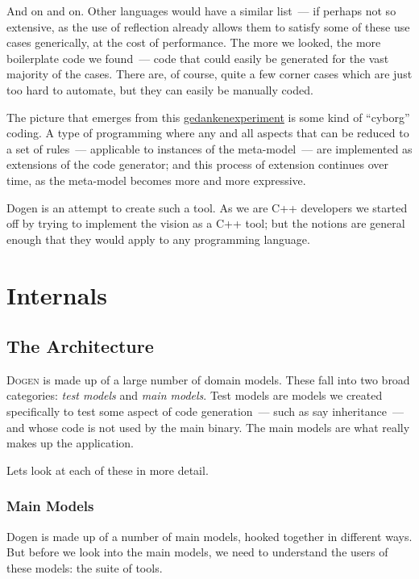 \documentclass{book}
\begin{document}
And on and on. Other languages would have a similar list~--- if
perhaps not so extensive, as the use of reflection already allows them
to satisfy some of these use cases generically, at the cost of
performance. The more we looked, the more boilerplate code we
found~--- code that could easily be generated for the vast majority of
the cases. There are, of course, quite a few corner cases which are
just too hard to automate, but they can easily be manually coded.

The picture that emerges from this
\href{http://en.wikipedia.org/wiki/Thought_experiment}{gedankenexperiment}
is some kind of ``cyborg'' coding. A type of programming where any and
all aspects that can be reduced to a set of rules~--- applicable to
instances of the meta-model~--- are implemented as extensions of the
code generator; and this process of extension continues over time, as
the meta-model becomes more and more expressive.

Dogen is an attempt to create such a tool. As we are C++ developers we
started off by trying to implement the vision as a C++ tool; but the
notions are general enough that they would apply to any programming
language.

\part{Internals}
\label{internals}

\chapter{The Architecture}

\lettrine{D}{ogen} is made up of a large number of domain
models. These fall into two broad categories: \emph{test models} and
\emph{main models}. Test models are models we created specifically to
test some aspect of code generation~--- such as say inheritance~---
and whose code is not used by the main binary. The main models are
what really makes up the application.

Lets look at each of these in more detail.

\section{Main Models}

Dogen is made up of a number of main models, hooked together in
different ways. But before we look into the main models, we need to
understand the users of these models: the suite of tools.
\end{document}
